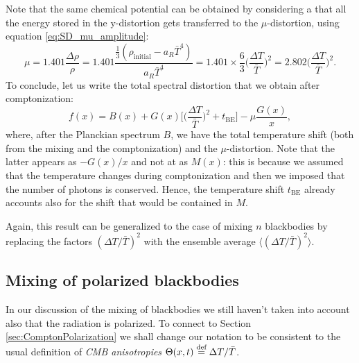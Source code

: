 Note that the same chemical potential can be obtained by considering a that all the energy stored in the y-distortion gets transferred to the $\mu$-distortion, using equation \eqref{eq:SD_mu_amplitude}:$$\mu=1.401\frac{\Delta \rho}{\rho}=1.401\frac{\frac{1}{3}(\rho_\text{initial}-a_R \bar T^4)}{a_R \bar T^4}=1.401\times\frac{6}{3}\bigg(\frac{\Delta T}{\bar T}\bigg)^2=2.802\bigg(\frac{\Delta T}{\bar T}\bigg)^2.$$
To conclude, let us write the total spectral distortion that we obtain after comptonization:
$$f(x)=B(x)+G(x)\bigg[\bigg(\frac{\Delta T}{\bar T}\bigg)^2+t_\text{BE}\bigg]-\mu\frac{G(x)}{x},$$
where, after the Planckian spectrum $B$, we have the total temperature shift (both from the mixing and the comptonization) and the $\mu$-distortion. Note that the latter appears as $-G(x)/x$ and not at as $M(x)$: this is because we assumed that the temperature changes during comptonization and then we imposed that the number of photons is conserved. Hence, the temperature shift $t_\text{BE}$ already accounts also for the shift that would be contained in $M$.

Again, this result can be generalized to the case of mixing $n$ blackbodies by replacing the factors $(\Delta T /\bar T)^2$ with the ensemble average $\langle(\Delta T /\bar T)^2\rangle$.

\subsection{Mixing of polarized blackbodies}
\label{sec:MixingPolarization}
In our discussion of the mixing of blackbodies we still haven't taken into account also that the radiation is polarized. To connect to Section \ref{sec:ComptonPolarization} we shall change our notation to be consistent to the usual definition of \emph{CMB anisotropies} $\Theta(x,t)\stackrel{\text{def}}{=} \Delta T/\bar T$.

